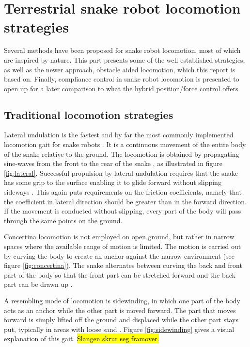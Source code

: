 \section{Terrestrial snake robot locomotion strategies}



Several methods have been proposed for snake robot locomotion, most of which are inspired by nature. This part presents some of the well established strategies, as well as the newer approach, obstacle aided locomotion, which this report is based on. Finally, compliance control in snake robot locomotion is presented to open up for a later comparison to what the hybrid position/force control offers.

\subsection{Traditional locomotion strategies}

Lateral undulation is the fastest and by far the most commonly implemented locomotion gait for snake robots \cite{sanfilippo2017perception}.
It is a continuous movement of the entire body of the snake relative to the ground. The locomotion is obtained by propagating sine-waves from the front to the rear of the snake \cite{transeth2006developments}, as illustrated in figure \ref{fig:lateral}.
Successful propulsion by lateral undulation requires that the snake has some grip to the surface enabling it to glide forward without slipping sideways \cite{liljeback2012review}. This again puts requirements on the friction coefficients, namely that the coefficient in lateral direction should be greater than in the forward
direction. If the movement is conducted without slipping, every part of the body will pass through the same points on the ground.

Concertina locomotion is not employed on open ground, but rather in narrow spaces where the available range of motion is limited. The motion is carried out by curving the body
to create an anchor against the narrow environment (see figure \ref{fig:concertina}). The snake alternates between curving the back and front part of the body so that the front part can be stretched forward and the back part can be drawn up \cite{liljeback2012snake}.

A resembling mode of locomotion is sidewinding, in which one part of the body acts as an anchor while the other part is moved forward. The part that moves forward is simply lifted off the ground and displaced while the other part stays put, typically in areas with loose sand \cite{liljeback2012snake}. Figure \ref{fig:sidewinding} gives a visual explanation of this gait. \hl{Slangen skrur seg framover.}


